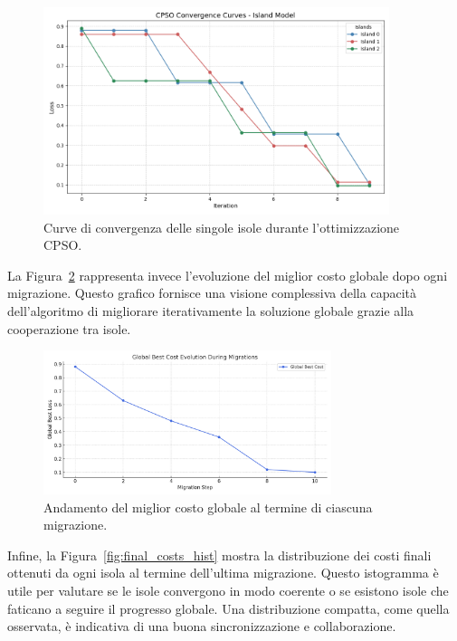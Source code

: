 \documentclass{article}
\begin{document}
\begin{figure}[H]
    \centering
    \includegraphics[width=0.9\textwidth]{img/CPSO Convergence Curves - Island Mode.png}
    \caption{Curve di convergenza delle singole isole durante l’ottimizzazione CPSO.}
    \label{fig:convergenza_isole}
\end{figure}

La Figura~\ref{fig:global_cost} rappresenta invece l’evoluzione del miglior costo globale dopo ogni migrazione. 
Questo grafico fornisce una visione complessiva della capacità dell’algoritmo di migliorare iterativamente la 
soluzione globale grazie alla cooperazione tra isole.

\begin{figure}[H]
    \centering
    \includegraphics[width=0.75\textwidth]{img/global_best_cost_per_migration.png}
    \caption{Andamento del miglior costo globale al termine di ciascuna migrazione.}
    \label{fig:global_cost}
\end{figure}

Infine, la Figura~\ref{fig:final_costs_hist} mostra la distribuzione dei costi finali ottenuti da ogni isola al 
termine dell’ultima migrazione. Questo istogramma è utile per valutare se le isole convergono in modo coerente o 
se esistono isole che faticano a seguire il progresso globale. Una distribuzione compatta, come quella osservata, 
è indicativa di una buona sincronizzazione e collaborazione.
\end{document}
